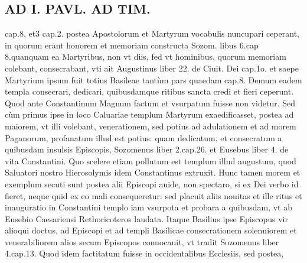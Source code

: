 \documentclass{article}
\begin{document}
\begin{pages}
\section*{AD I. PAVL. AD TIM. }
\marginpar{[ p.72 ]}\pstart cap.8, et3 cap.2. postea Apostolorum et Martyrum vocabulis nuncupari ceperant, in quorum erant honorem et memoriam constructa Sozom. libus  6.cap 8.quanquam ea Martyribus, non vt diis, fed vt hominibus, quorum memoriam colebant, consecrabant, vti ait Augustinus liber 22. de Ciuit. Dei cap.1o. et saepe Martyrium ipsum fuit totius Basileae tantùm pars quaedam cap.8. Demum eadem templa consecrari, dedicari, quibusdamque ritibus sancta credi et fieri ceperunt. Quod ante Constantinum Magnum factum et vsurpatum fuisse non videtur. Sed cùm primus ipse in loco Caluariae templum Martyrum exaedificasset, postea ad maiorem, vt illi volebant, venerationem, sed potius ad adulationem et ad morem Paganorum, profanatum illud est potius: quam dedicatum, et consecratum a quibusdam insulsis Episcopis, Sozomenus liber 2.cap.26. et Eusebus liber 4. de vita Constantini. Quo scelere etiam pollutum est templum illud augustum, quod Saluatori nostro Hierosolymis idem Constantinus extruxit. Hunc tamen morem et exemplum secuti sunt postea alii Episcopi auide, non spectaro, si ex Dei verbo id fieret, neque quid ex eo mali consequeretur: sed placuit aliis nouitas et ille ritus et inauguratio in Constantini templo iam vsurpota et probara a quibusdam, vt ab Eusebio Caesariensi Rethoricoteros laudata. Itaque Basilius ipse Episcopus vir alioqui doctus, ad Episcopi et ad templi Basilicae consecrationem solenniorem et venerabiliorem alios secum Episcopos conuocauit, vt tradit Sozomenus liber 4.cap.13. Quod idem factitatum fuisse in occidentalibus Ecclesiis, sed postea,  \pend

\end{pages}
\end{document}
